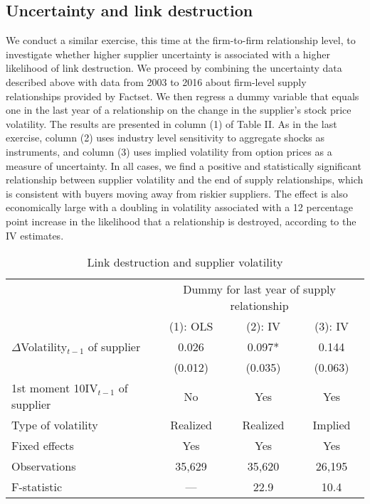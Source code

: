\documentclass[11pt]{article}
\theoremstyle{definition}
\begin{document}
	\subsection{Uncertainty and link destruction}
	We conduct a similar exercise, this time at the firm-to-firm relationship level, to investigate whether higher supplier uncertainty is associated with a higher likelihood of link destruction. We proceed by combining the uncertainty data described above with data from 2003 to 2016 about firm-level supply relationships provided by Factset. We then regress a dummy variable that equals one in the last year of a relationship on the change in the supplier’s stock price volatility. The results are presented in column (1) of Table II. As in the last exercise, column (2) uses industry level sensitivity to aggregate shocks as instruments, and column (3) uses implied volatility from option prices as a measure of uncertainty. In all cases, we find a positive and statistically significant relationship between supplier volatility and the end of supply relationships, which is consistent with buyers moving away from riskier suppliers. The effect is also economically large with a doubling in volatility associated with a 12 percentage point increase in the likelihood that a relationship is destroyed, according to the IV estimates.
	
	\begin{table}[ht]
		\centering
		\caption{Link destruction and supplier volatility}
		\begin{tabular}{lccc}
				\hline
				& \multicolumn{3}{c}{Dummy for last year of supply relationship} \\
				\cline{2-4}
				& (1): OLS & (2): IV & (3): IV \\
				\hline
				$\Delta$Volatility$_{t-1}$ of supplier & 0.026 & 0.097* & 0.144 \\
				& (0.012) & (0.035) & (0.063) \\
				1st moment 10IV$_{t-1}$ of supplier & No & Yes & Yes \\
				Type of volatility & Realized & Realized & Implied \\
				Fixed effects & Yes & Yes & Yes \\
				Observations & 35,629 & 35,620 & 26,195 \\
				F-statistic & --- & 22.9 & 10.4 \\
				\hline
		\end{tabular}
	\end{table}
	
\end{document}
